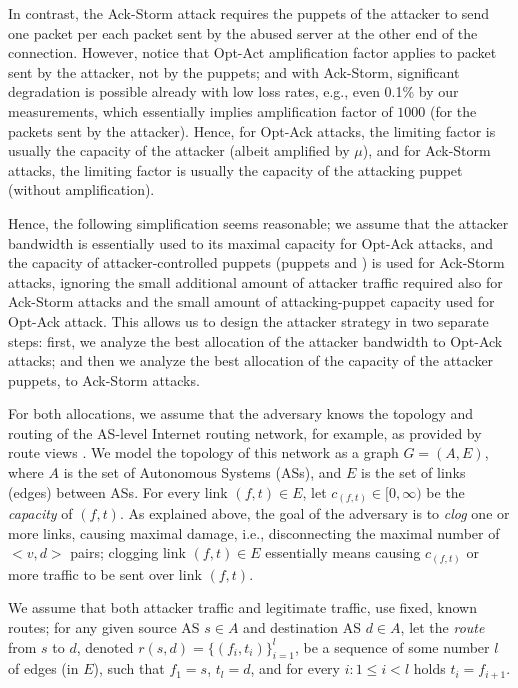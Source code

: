 \documentclass[conference]{IEEEtran}
\newcommand{\ampfact}{\mu}
\begin{document}
In contrast, the Ack-Storm attack requires the puppets of the attacker to send one packet per each packet sent by the abused server at the other end of the connection. However, notice that Opt-Act amplification factor applies to packet sent by the attacker, not by the puppets; and with Ack-Storm, significant degradation is possible already with low loss rates, e.g., even 0.1\% by our measurements, which essentially implies amplification factor of $1000$ (for the packets sent by the attacker). Hence, for Opt-Ack attacks, the limiting factor is usually the capacity of the attacker (albeit amplified by $\ampfact$), and for Ack-Storm attacks, the limiting factor is usually the capacity of the attacking puppet (without amplification). 

Hence, the following simplification seems reasonable; we assume that the attacker bandwidth is essentially used to its maximal capacity for Opt-Ack attacks, and the  capacity of attacker-controlled puppets (puppets and \wzs) is used for Ack-Storm attacks, ignoring the small additional amount of attacker traffic required also for Ack-Storm attacks and the small amount of attacking-puppet capacity used for Opt-Ack attack. This allows us to design the attacker strategy in two separate steps: first, we analyze the best allocation of the attacker bandwidth to Opt-Ack attacks; and then we analyze the best allocation of the capacity of the attacker puppets, to Ack-Storm attacks. 

For both allocations, we assume that the adversary knows the topology and routing of the AS-level Internet routing network, for example, as provided by route views \cite{routeviews}.
We model the topology of this network as a graph $G=(A,E)$, where $A$ is the set of Autonomous Systems (ASs), and $E$ is the set of links (edges) between ASs. For every link $(f,t)\in E$, let $c_{(f,t)}\in [0,\infty)$ be the {\em capacity} of $(f,t)$. As explained above, the goal of the adversary is to {\em clog} one or more links, causing maximal damage, i.e., disconnecting the maximal number of $<v,d>$ pairs; clogging link $(f,t)\in E$ essentially means causing $c_{(f,t)}$ or more traffic to be sent over link $(f,t)$. 

We assume that both attacker traffic and legitimate traffic, use fixed, known routes; for any given source AS $s\in A$ and destination AS $d\in A$, let the {\em route} from $s$ to $d$, denoted $r(s,d)=\{(f_i,t_i)\}_{i=1}^l$, be a sequence of some number $l$ of edges (in $E$), such that $f_1=s$, $t_l=d$, and for every $i:1\leq i < l$ holds $t_i=f_{i+1}$. 
\end{document}
